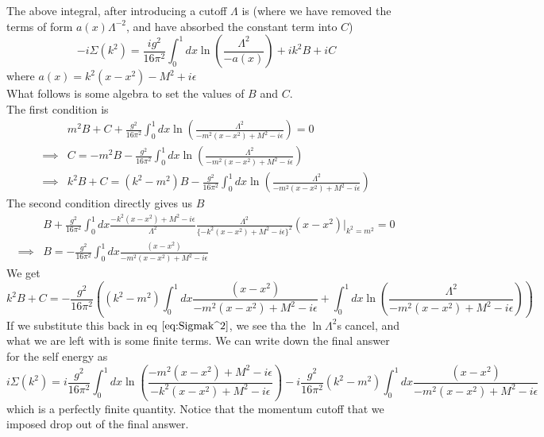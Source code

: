 \documentclass[11pt]{article}
\numberwithin{equation}{section}
\begin{document}
The above integral, after introducing a cutoff \(\Lambda\) is (where we have removed the terms of form \(a(x)\Lambda^{-2}\), and have absorbed the constant term into \(C\)) 
\begin{equation}
    -i\Sigma(k^2) = \frac{ig^2}{16\pi^2} \int_0^1 dx \ln\left(\frac{\Lambda^2}{-a(x)}\right) + ik^2B + iC
    \label{eq:Sigmak^2}
\end{equation}
where \(a(x) = k^2(x-x^2) - M^2 + i\epsilon\)\\

What follows is some algebra to set the values of \(B\) and \(C\). \\
The first condition is 
\begin{align*}
    & m^2B + C + \frac{g^2}{16\pi^2} \int_0^1 dx\ln\left( \frac{\Lambda^2}{-m^2(x-x^2) + M^2 - i\epsilon}  \right) = 0\\
    \implies &   C = -m^2B - \frac{g^2}{16\pi^2} \int_0^1 dx\ln\left( \frac{\Lambda^2}{-m^2(x-x^2) + M^2 - i\epsilon}  \right) \\
    \implies & k^2B + C = (k^2 -m^2)B - \frac{g^2}{16\pi^2} \int_0^1 dx\ln\left( \frac{\Lambda^2}{-m^2(x-x^2) + M^2 - i\epsilon}\right)
\end{align*}
The second condition directly gives us \(B\) 
\begin{align*}
    &B + \frac{g^2}{16\pi^2} \int_0^1 dx \frac{-k^2(x-x^2) + M^2 - i\epsilon}{\Lambda^2}\frac{\Lambda^2}{\{-k^2(x-x^2) + M^2 - i\epsilon\}^2}(x - x^2) \bigg|_{k^2 = m^2} = 0\\
    \implies &B  = -\frac{g^2}{16\pi^2} \int_0^1 dx \frac{(x - x^2)}{-m^2(x-x^2) + M^2 - i\epsilon}
\end{align*}
We get 
\begin{equation*}
    k^2B + C = -\frac{g^2}{16\pi^2}\left( (k^2-m^2)\int_0^1 dx \frac{(x - x^2)}{-m^2(x-x^2) + M^2 - i\epsilon} + \int_0^1 dx\ln\left( \frac{\Lambda^2}{-m^2(x-x^2) + M^2 - i\epsilon}\right) \right)
\end{equation*}
If we substitute this back in eq \(\ref{eq:Sigmak^2}\), we see tha the \(\ln \Lambda^2\)s cancel, and what we are left with is some finite terms. We can write down the final answer for the self energy as 
\begin{equation*}
    i\Sigma(k^2) = i\frac{g^2}{16\pi^2}\int_0^1 dx \ln\left(\frac{-m^2(x-x^2) + M^2 - i\epsilon}{-k^2(x-x^2) + M^2 - i\epsilon}\right) -i\frac{g^2}{16\pi^2}(k^2-m^2) \int_0^1 dx \frac{(x - x^2)}{-m^2(x-x^2) + M^2 - i\epsilon}
\end{equation*}
which is a perfectly finite quantity. Notice that the momentum cutoff that we imposed drop out of the final answer.\\
\end{document}
